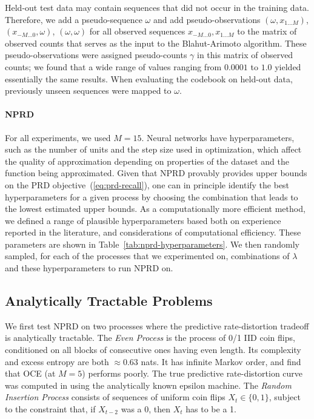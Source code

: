 \documentclass[entropy,article,submit,moreauthors,pdftex,10pt,a4paper]{Definitions/mdpi}
\begin{document}
Held-out test data may contain sequences that did not occur in the training data. Therefore, we add a pseudo-sequence $\omega$ and add pseudo-observations $(\omega, x_{1...M})$, $(x_{-M...0}, \omega)$, $(\omega, \omega)$ for all observed sequences $x_{-M...0}, x_{1...M}$ to the matrix of observed counts that serves as the input to the Blahut-Arimoto algorithm.
These pseudo-observations were assigned pseudo-counts $\gamma$ in this matrix of observed counts; we found that a wide range of values ranging from $0.0001$ to $1.0$ yielded essentially the same results.
When evaluating the codebook on held-out data, previously unseen sequences were mapped to $\omega$.


\paragraph{NPRD}
For all experiments, we used $M=15$.
Neural networks have hyperparameters, such as the number of units and the step size used in optimization, which affect the quality of approximation depending on properties of the dataset and the function being approximated.
Given that NPRD provably provides upper bounds on the PRD objective~(\ref{eq:prd-recall}), one can in principle identify the best hyperparameters for a given process by choosing the combination that leads to the lowest estimated upper bounds.
As a computationally more efficient method, we defined a range of plausible hyperparameters based both on experience reported in the literature, and considerations of computational efficiency.
These parameters are shown in Table~\ref{tab:nprd-hyperparameters}.
We then randomly sampled, for each of the processes that we experimented on, combinations of $\lambda$ and these hyperparameters to run NPRD on.


\subsection{Analytically Tractable Problems}\label{sec:tractable}

We first test NPRD on two processes where the predictive rate-distortion tradeoff is analytically tractable. %
The \emph{Even Process} \citep{marzen-predictive-2016} is the process of 0/1 IID coin flips, conditioned on all blocks of consecutive ones having even length.
Its complexity and excess entropy are both $\approx 0.63$ nats. %
It has infinite Markov order, and \cite{marzen-predictive-2016} find that OCE (at $M=5$) performs poorly. %
The true predictive rate-distortion curve was computed in \cite{marzen-predictive-2016} using the analytically known epsilon machine.
The \emph{Random Insertion Process} \citep{marzen-predictive-2016} consists of sequences of uniform coin flips $X_t \in \{0,1\}$, subject to the constraint that, if $X_{t-2}$ was a 0, then $X_{t}$ has to be a 1.
\end{document}

